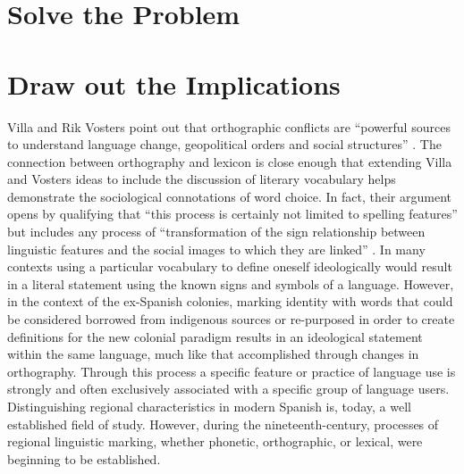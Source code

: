 \documentclass[12pt]{report}
\begin{document}
\section{Solve the Problem}
\section{Draw out the Implications}
Villa and Rik Vosters point out that orthographic conflicts are \enquote{powerful sources to understand language change, geopolitical orders and social structures} \autocite{Villa2015a}.
The connection between orthography and lexicon is close enough that extending Villa and Vosters ideas to include the discussion of literary vocabulary helps demonstrate the sociological connotations of word choice.
In fact, their argument opens by qualifying that \enquote{this process is certainly not limited to spelling features} but includes any process of \enquote{transformation of the sign relationship between linguistic features and the social images to which they are linked} \autocite*[203]{Villa2015a}.
In many contexts using a particular vocabulary to define oneself ideologically would result in a literal statement using the known signs and symbols of a language.
However, in the context of the ex-Spanish colonies, marking identity with words that could be considered borrowed from indigenous sources or re-purposed in order to create definitions for the new colonial paradigm results in an ideological statement within the same language, much like that accomplished through changes in orthography.
Through this process a specific feature or practice of language use is strongly and often exclusively associated with a specific group of language users.
Distinguishing regional characteristics in modern Spanish is, today, a well established field of study.
However, during the nineteenth-century, processes of regional linguistic marking, whether phonetic, orthographic, or lexical, were beginning to be established.
\end{document}
